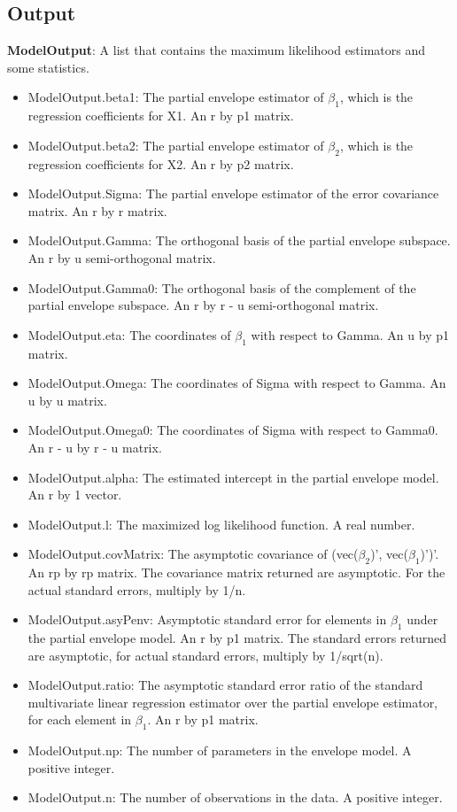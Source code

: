 \documentclass[a4paper,11pt,openany]{memoir}
\begin{document}
\subsection*{Output}

\begin{par}
\textbf{ModelOutput}: A list that contains the maximum likelihood estimators and some statistics.
\end{par} \vspace{1em}
\begin{itemize}
\setlength{\itemsep}{-1ex}
   \item ModelOutput.beta1: The partial envelope estimator of $\beta_1$, which is the regression coefficients for X1. An r by p1 matrix.
   \item ModelOutput.beta2: The partial envelope estimator of $\beta_2$, which is the regression coefficients for X2. An r by p2 matrix.
   \item ModelOutput.Sigma: The partial envelope estimator of the error covariance matrix.  An r by r matrix.
   \item ModelOutput.Gamma: The orthogonal basis of the partial envelope subspace. An r by u semi-orthogonal matrix.
   \item ModelOutput.Gamma0: The orthogonal basis of the complement of the partial envelope subspace.  An r by r - u semi-orthogonal matrix.
   \item ModelOutput.eta: The coordinates of $\beta_1$ with respect to Gamma. An u by p1 matrix.
   \item ModelOutput.Omega: The coordinates of Sigma with respect to Gamma. An u by u matrix.
   \item ModelOutput.Omega0: The coordinates of Sigma with respect to Gamma0. An r - u by r - u matrix.
   \item ModelOutput.alpha: The estimated intercept in the partial envelope model.  An r by 1 vector.
   \item ModelOutput.l: The maximized log likelihood function.  A real number.
   \item ModelOutput.covMatrix: The asymptotic covariance of (vec($\beta_2$)', vec($\beta_1$)')'.  An rp by rp matrix.  The covariance matrix returned are asymptotic.  For the actual standard errors, multiply by 1/n.
   \item ModelOutput.asyPenv: Asymptotic standard error for elements in $\beta_1$ under the partial envelope model.  An r by p1 matrix.  The standard errors returned are asymptotic, for actual standard errors, multiply by 1/sqrt(n).
   \item ModelOutput.ratio: The asymptotic standard error ratio of the standard multivariate linear regression estimator over the partial envelope estimator, for each element in $\beta_1$.  An r by p1 matrix.
   \item ModelOutput.np: The number of parameters in the envelope model.  A positive integer.
   \item ModelOutput.n: The number of observations in the data.  A positive integer.
\end{itemize}
\end{document}
